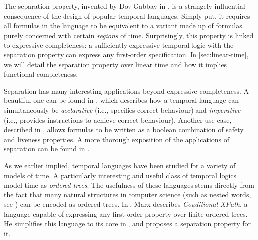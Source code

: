 \documentclass[a4paper,UKenglish,cleveref, autoref, thm-restate, numberwithinsect]{lipics-v2021}
\begin{document}
The separation property, invented by Dov Gabbay in \cite{Gabbay1981}, is a strangely influential consequence of the design of popular temporal languages. Simply put, it requires all formulas in the language to be equivalent to a variant made up of formulas purely concerned with certain \textit{regions} of time. Surprisingly, this property is linked to expressive completeness: a sufficiently expressive temporal logic with the separation property can express any first-order specification. In \cref{sec:linear-time}, we will detail the separation property over linear time and how it implies functional completeness.


Separation has many interesting applications beyond expressive completeness. A beautiful one can be found in \cite{DecPastImpFuture89}, which describes how a temporal language can simultaneously be \textit{declarative} (i.e., specifies correct behaviour) and \textit{imperative} (i.e., provides instructions to achieve correct behaviour). Another use-case, described in \cite{Lichtenstein1985TheGO}, allows formulas to be written as a boolean combination of safety and liveness properties. A more thorough exposition of the applications of separation can be found in \cite{GabbayBirthday05}.

As we earlier implied, temporal languages have been studied for a variety of models of time. A particularly interesting and useful class of temporal logics model time as \textit{ordered trees}. The usefulness of these languages stems directly from the fact that many natural structures in computer science (such as nested words, see \cite{alur2009}) can be encoded as ordered trees. In \cite{marx2005conditional}, Marx describes \textit{Conditional XPath}, a language capable of expressing any first-order property over finite ordered trees. He simplifies this language to its core in \cite{xpathComplete}, and proposes a separation property for it.
\end{document}
